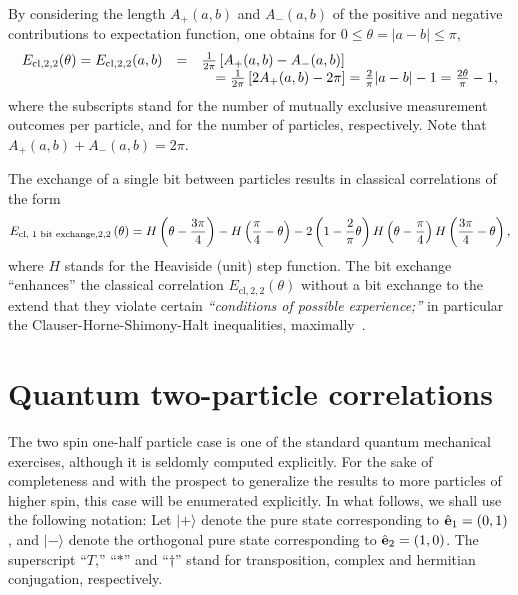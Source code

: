 \documentclass[pra,amsfonts,showpacs,showkeys,preprint]{revtex4}
\begin{document}
By considering the length  $A_+(a,b)$ and $A_-(a,b)$ of the positive and negative contributions to expectation function,
one obtains for
$0\le \theta=\vert a-b\vert \le \pi$,
\begin{equation}
\begin{array}{rcl}
E_{\text{cl},2,2}(\theta ) =E_{\text{cl},2,2}(a,b) &=& \frac{1}{2\pi} \left[A_+(a,b)-A_-(a,b)\right]\\
&& \quad =  \frac{1}{2\pi} \left[2A_+(a,b) -2\pi \right]=
{2\over \pi}\vert a-b\vert - 1 = {2\theta \over \pi} - 1,
\label{2009-gtq-eclass}
\end{array}
\end{equation}
where the subscripts stand for the number of mutually exclusive measurement outcomes per particle, and
for the number of particles, respectively.
Note that $A_+(a,b)+A_-(a,b)=2\pi$.

The exchange of a single bit between particles results in classical correlations of the form~\cite{svozil-2004-brainteaser}
\begin{equation}
E_{\text{cl, 1 bit exchange},2,2}\left(\theta \right)
=
H\left(\theta - {3 \pi\over 4}\right)
 - H\left({\pi \over 4} - \theta \right)  -
  2\left(1 - {2\over \pi}\theta \right)
H\left(\theta - {\pi\over 4}\right) H\left({3 \pi\over 4} - \theta \right)
,
\label{e-2004-brainteaser-2a}
\end{equation}
where $H$ stands for the Heaviside (unit) step function.
The bit exchange ``enhances'' the classical correlation $E_{\text{cl},2,2}(\theta )$ without a bit exchange to the extend
that they violate certain {\em ``conditions of possible experience;''} in particular
 the Clauser-Horne-Shimony-Halt inequalities, maximally~\cite{popescu-97b}.





\section{Quantum  two-particle correlations}

The two spin one-half particle case is one of the standard quantum mechanical exercises, although
it is seldomly computed explicitly.
For the sake of completeness and with the prospect to generalize the results to more particles of higher spin,
this case will be enumerated explicitly.
In what follows, we shall use the following notation:
Let
$
\vert +\rangle
$
denote the pure state corresponding to
$ {\hat {\bf e}}_1 =(0,1)
$,
and
$
\vert -\rangle $ denote the orthogonal pure state
corresponding to
${\hat {\bf e}}_2 =(1,0)
$.
The superscript
``$T$,''
``$\ast$'' and
``$\dagger$'' stand for transposition, complex and hermitian conjugation, respectively.
\end{document}
